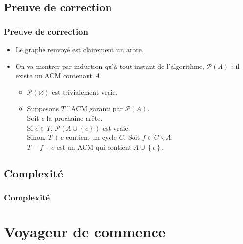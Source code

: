 \documentclass{beamer}
\begin{document}
	\subsection{Preuve de correction}
		\begin{frame}
			\frametitle{Preuve de correction}
			
			\begin{itemize}
				\item Le graphe renvoyé est clairement un arbre.
				\item On va montrer par induction qu'à tout instant de
					l'algorithme, $\mathcal{P}(A)$ : il existe un ACM
					contenant $A$. 
					\begin{itemize}
						\item $\mathcal{P}(\varnothing)$ est trivialement
							vraie.
						\item Supposons $T$ l'ACM garanti par
							$\mathcal{P}(A)$.\\
							Soit $e$ la prochaine arête.\\
							Si $e \in T$,
							$\mathcal{P}(A\cup\left\{e\right\})$
							est vraie.\\
							Sinon, $T+e$ contient un cycle $C$. Soit $f
							\in C \backslash A$.\\
							$T-f+e$ est un ACM qui contient
							$A\cup\left\{e\right\}$.
					\end{itemize}
			\end{itemize}
		\end{frame}
	\subsection{Complexité}
		\begin{frame}
			\frametitle{Complexité}
			
				
		\end{frame}
	\section{Voyageur de commence}
\end{document}
